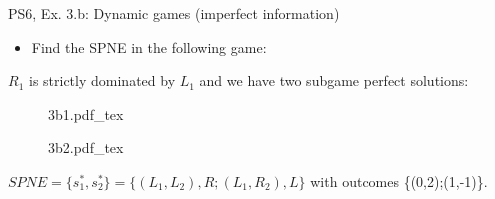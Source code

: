 \begin{frame}{PS6, Ex. 3.b: Dynamic games (imperfect information)}
    \begin{itemize}
      \item[(b)] Find the SPNE in the following game:
    \end{itemize}
    $R_1$ is strictly dominated by $L_1$ and we have two subgame perfect solutions:
    \begin{multicols}{2}
      \begin{figure}[!h]
        \center
        \def\svgwidth{\columnwidth}
        {3b1.pdf_tex}
      \end{figure}
      \vfill\null\columnbreak
      \begin{figure}[!h]
        \center
        \def\svgwidth{\columnwidth}
        {3b2.pdf_tex}
      \end{figure}
    \end{multicols}
    \vspace{-8pt}
    $SPNE=\{s_1^{*},s_2^{*}\}=\{(L_1,L_2),R;(L_1,R_2),L\}$ with outcomes \{(0,2);(1,-1)\}.
    \vfill\null
\end{frame}

